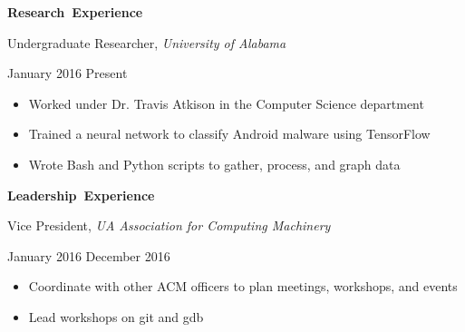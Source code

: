 \documentclass[11pt]{article}
\begin{document}
\vspace{0.8em}
\hbox{\large \textbf{Research Experience}}

\vspace{0.4em}
\begin{minipage}[t]{0.65\textwidth}
\flushleft
Undergraduate Researcher, \textit{University of Alabama}\\
\end{minipage}
\begin{minipage}[t]{0.30\textwidth}
\flushright
January 2016 \space \textemdash \space Present\\
\end{minipage}

\begin{itemize}
  \item Worked under Dr. Travis Atkison in the Computer Science department
  \item Trained a neural network to classify Android malware using TensorFlow
  \item Wrote Bash and Python scripts to gather, process, and graph data
\end{itemize}

\vspace{0.8em}
\hbox{\large \textbf{Leadership Experience}}

\vspace{0.4em}
\begin{minipage}[t]{0.65\textwidth}
\flushleft
Vice President, \textit{UA Association for Computing Machinery}\\
\end{minipage}
\begin{minipage}[t]{0.30\textwidth}
\flushright
January 2016 \space \textemdash \space December 2016\\
\end{minipage}

\begin{itemize}
  \item Coordinate with other ACM officers to plan meetings, workshops, and events
  \item Lead workshops on git and gdb
\end{itemize}
\end{document}
